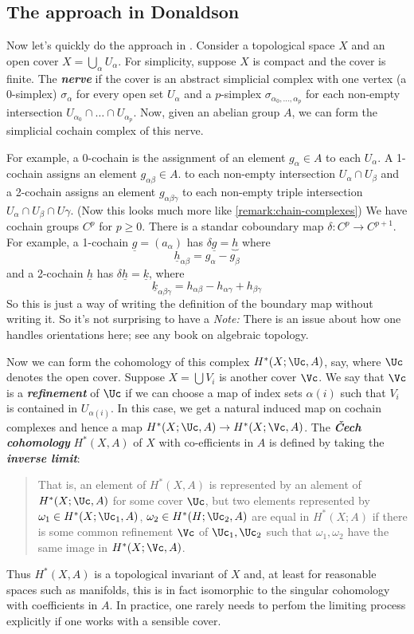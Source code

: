 \subsection{The approach in Donaldson}

Now let's quickly do the approach in \cite{donaldson}.
Consider a topological space $X$ and an open cover $X=\bigcup_\alpha U_\alpha$. For simplicity, suppose $X$ is compact and the cover is finite. The \textbf{\textit{nerve}} if the cover is an abstract simplicial complex with one vertex (a 0-simplex) $\sigma_\alpha$ for every open set $U_\alpha$ and a $p$-simplex $\sigma_{\alpha_0,\ldots,\alpha_p}$ for each non-empty intersection $U_{\alpha_0}\cap\ldots\cap U_{\alpha_p}$. Now, given an abelian group $A$, we can form the simplicial cochain complex of this nerve.

For example, a 0-cochain is the assignment of an element $g_\alpha\in A$ to each $U_\alpha$. A 1-cochain assigns an element $g_{\alpha\beta}\in A$. to each non-empty intersection $U_\alpha\cap U_\beta$ and a 2-cochain assigns an element $g_{\alpha\beta\gamma}$ to each non-empty triple intersection $U_\alpha\cap U_\beta\cap U\gamma$. {\color{cyan}(Now this looks much more like \cref{remark:chain-complexes})} We have cochain groups $C^p$ for $p\geq 0$. There is a standar coboundary map $\delta:C^p\to C^{p+1}$. For example, a 1-cochain $\underline{g}=(a_\alpha)$ has $\delta\underline{g}=\underbrace{h}$ where
\[\underline{h}_{\alpha\beta}=g_\alpha-g_\beta\]
and a 2-cochain $\underline{h}$ has $\delta\underline{h}=\underline{k}$, where
\[\underline{k}_{\alpha\beta\gamma}=h_{\alpha\beta}-h_{\alpha\gamma}+h_{\beta\gamma}\]
{\color{cyan}So this is just a way of writing the definition of the boundary map without writing it. So it's not surprising to have a} \textit{Note:} There is an issue about how one handles orientations here; see any book on algebraic topology.

Now we can form the cohomology of this complex $H^*(X;\Uc,A)$, say, where $\Uc$ denotes the open cover. Suppose $X=\bigcup V_i$ is another cover $\Vc$. We say that $\Vc$ is a \textbf{\textit{refinement}} of $\Uc$ if we can choose a map of index sets $\alpha(i)$ such that $V_i$ is contained in $U_{\alpha(i)}$. In this case, we get a natural induced map on cochain complexes and hence a map $H^*(X;\Uc,A)\to H^*(X;\Vc,A)$. The \textbf{\textit{\v Cech cohomology}} $H^*(X,A)$ of $X$ with co-efficients in $A$ is defined by taking the \textbf{\textit{inverse limit}}:

\begin{quote}
	That is, an element of $H^*(X,A)$ is represented by an alement of $H^*(X;\Uc,A)$ for some cover $\Uc$, but two elements represented by $\omega_1\in H^*(X;\Uc_1,A)$, $\omega_2\in H^*(H;\Uc_2,A)$ are equal in $H^*(X;A)$ if there is some common refinement $\Vc$ of $\Uc_1,\Uc_2$ such that $\omega_1,\omega_2$ have the same image in $H^*(X;\Vc,A)$.
\end{quote}
Thus $H^*(X,A)$ is a topological invariant of $X$ and, at least for reasonable spaces such as manifolds, this is in fact isomorphic to the singular cohomology with coefficients in $A$. In practice, one rarely needs to perfom the limiting process explicitly if one works with a sensible cover.

